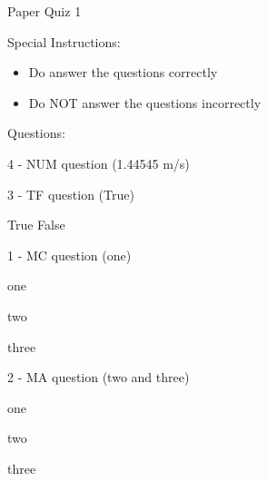 \documentclass[letterpaper,10pt]{article}
\begin{document}
\begin{center}
{\Large Paper Quiz 1}
\end{center}

Special Instructions:
\begin{itemize}
    \item Do answer the questions correctly
    \item Do NOT answer the questions incorrectly
\end{itemize}
\vspace{10pt}
Questions:
\vspace{10pt}

\begin{compactenum} 
\begin{minipage}{\linewidth}
    \item \label{1} 4 - NUM question (1.44545 m/s)
    
    \end{minipage}

    \vspace{10pt}

\begin{minipage}{\linewidth}
    \item \label{2} 3 - TF question (True)

        True \hskip 1cm False
    
    \end{minipage}

    \vspace{10pt}

\begin{minipage}{\linewidth}
    \item \label{3} 1 - MC question (one)
    \begin{compactenum} 
        \item \label{31} one
        \item \label{32} two
        \item \label{33} three
    \end{compactenum}
    
    \end{minipage}

    \vspace{10pt}

\begin{minipage}{\linewidth}
    \item \label{4} 2 - MA question (two and three)
    \begin{compactenum} 
        \item \label{41} one
        \item \label{42} two
        \item \label{43} three
    \end{compactenum}
    
    \end{minipage}

    \vspace{10pt}

\end{compactenum}
\end{document}
